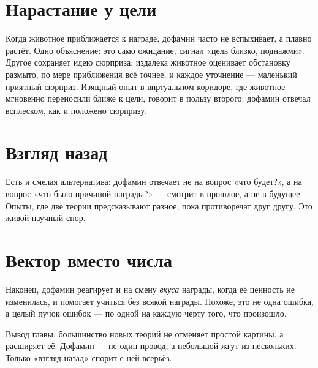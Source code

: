 \section*{Нарастание у цели}

Когда животное приближается к награде, дофамин часто не вспыхивает, а плавно растёт. Одно объяснение: это само ожидание, сигнал «цель близко, поднажми». Другое сохраняет идею сюрприза: издалека животное оценивает обстановку размыто, по мере приближения всё точнее, и каждое уточнение --- маленький приятный сюрприз. Изящный опыт в виртуальном коридоре, где животное мгновенно переносили ближе к цели, говорит в пользу второго: дофамин отвечал всплеском, как и положено сюрпризу.

\section*{Взгляд назад}

Есть и смелая альтернатива: дофамин отвечает не на вопрос «что будет?», а на вопрос «что было причиной награды?» --- смотрит в прошлое, а не в будущее. Опыты, где две теории предсказывают разное, пока противоречат друг другу. Это живой научный спор.

\section*{Вектор вместо числа}

Наконец, дофамин реагирует и на смену \emph{вкуса} награды, когда её ценность не изменилась, и помогает учиться без всякой награды. Похоже, это не одна ошибка, а целый пучок ошибок --- по одной на каждую черту того, что произошло.

Вывод главы: большинство новых теорий не отменяет простой картины, а расширяет её. Дофамин --- не один провод, а небольшой жгут из нескольких. Только «взгляд назад» спорит с ней всерьёз.

